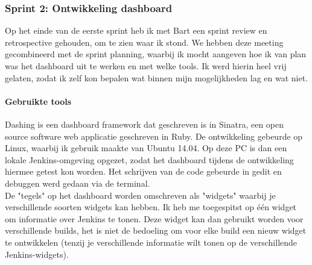 \documentclass[10pt,a4paper]{article}
\begin{document}
\subsubsection{Sprint 2: Ontwikkeling dashboard} 
\label{sprint2}
Op het einde van de eerste sprint heb ik met Bart een sprint review en retrospective gehouden, om te zien waar ik stond. We hebben deze meeting gecombineerd met de sprint planning, waarbij ik mocht aangeven hoe ik van plan was het dashboard uit te werken en met welke tools. Ik werd hierin heel vrij gelaten, zodat ik zelf kon bepalen wat binnen mijn mogelijkheden lag en wat niet. 
\paragraph{Gebruikte tools}
Dashing is een dashboard framework dat geschreven is in Sinatra, een open source software web applicatie geschreven in Ruby. De ontwikkeling gebeurde op Linux, waarbij ik gebruik maakte van Ubuntu 14.04. Op deze PC is dan een lokale Jenkins-omgeving opgezet, zodat het dashboard tijdens de ontwikkeling hiermee getest kon worden. Het schrijven van de code gebeurde in gedit en debuggen werd gedaan via de terminal.  \\
De "tegels" op het dashboard worden omschreven als "widgets" waarbij je verschillende soorten widgets kan hebben. Ik heb me toegespitst op \'e\'en widget om informatie over Jenkins te tonen. Deze widget kan dan gebruikt worden voor verschillende builds, het is niet de bedoeling om voor elke build een nieuw widget te ontwikkelen (tenzij je verschillende informatie wilt tonen op de verschillende Jenkins-widgets).
\end{document}
